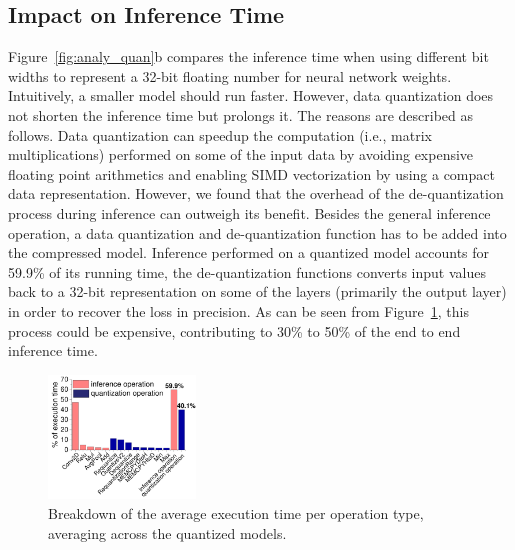 \subsection{Impact on Inference Time\label{sec:time}}
 Figure~\ref{fig:analy_quan}b compares the inference time when using different bit
widths to represent a 32-bit floating number for neural network weights. Intuitively, a smaller model should run faster. However, data
quantization does not shorten the inference time but prolongs it. The reasons are described as follows. Data quantization can speedup the
computation (i.e., matrix multiplications) performed on some of the input data by avoiding expensive floating point arithmetics and
enabling SIMD vectorization by using a compact data representation. However, we found that the overhead of the de-quantization process
during inference can outweigh its benefit. Besides the general inference operation, a data quantization and de-quantization function has to
be added into the compressed model. Inference performed on a quantized model accounts for 59.9\% of its running time, the de-quantization
functions converts input values back to a 32-bit representation on some of the layers (primarily the output layer) in order to recover the
loss in precision. As can be seen from Figure~\ref{fig:breakdown}, this process could be expensive, contributing to 30\% to 50\% of the end
to end inference time.

\begin{figure}
\begin{center}
\includegraphics[width=0.35\textwidth]{figure/breakdown0.pdf}
\end{center}
\vspace{-2mm}
\caption{Breakdown of the average execution time per operation type, averaging across the quantized models.}
\vspace{-6mm}
\label{fig:breakdown}
\end{figure}


